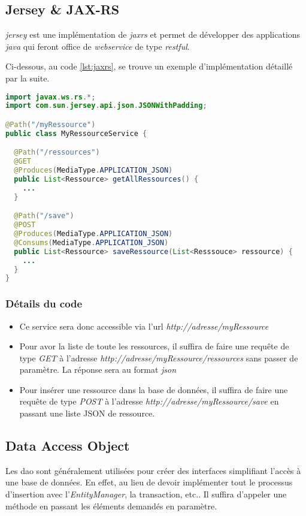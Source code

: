 \subsection{Jersey \& JAX-RS} %
\label{sub:jersey_&_jax_rs}

\emph{\gls{jersey}} est une implémentation de \emph{\gls{jaxrs}} et permet de développer des applications \emph{\gls{java}} qui feront office de \emph{\gls{webservice}} de type \emph{\gls{rest}ful}.

\medskip

Ci-dessous, au code \ref{lst:jaxrs}, se trouve un exemple d'implémentation détaillé par la suite.

\begin{lstlisting}[language={JAVA}, caption={Exemple d'implémentation JAX-RS}, label={lst:jaxrs}]
import javax.ws.rs.*;
import com.sun.jersey.api.json.JSONWithPadding;

@Path("/myRessource")
public class MyRessourceService {

  @Path("/ressources")
  @GET
  @Produces(MediaType.APPLICATION_JSON)
  public List<Ressource> getAllRessources() {
    ...
  }

  @Path("/save")
  @POST
  @Produces(MediaType.APPLICATION_JSON)
  @Consums(MediaType.APPLICATION_JSON)
  public List<Ressource> saveRessource(List<Resssouce> ressource) {
    ...
  }
}
\end{lstlisting}

\subsubsection{Détails du code}
\begin{itemize}
  \item Ce service sera donc accessible via l'url \emph{http://adresse/myRessource}
  \item Pour avor la liste de toute les ressources, il suffira de faire une requête de type \emph{GET} à l'adresse \emph{http://adresse/myRessource/ressources} sans passer de paramètre. La réponse sera au format \emph{\gls{json}}
  \item Pour insérer une ressource dans la base de données, il suffira de faire une requête de type \emph{POST} à l'adresse \emph{http://adresse/myRessource/save} en passant une liste JSON de ressource.
\end{itemize}

\subsection{Data Access Object}
Les \gls{dao} sont généralement utilisées pour créer des interfaces simplifiant l'accès à une base de données. En effet, au lieu de devoir implémenter tout le processus d'insertion avec l'\emph{EntityManager}, la transaction, etc.. Il suffira d'appeler une méthode en passant les éléments demandés en paramètre.

